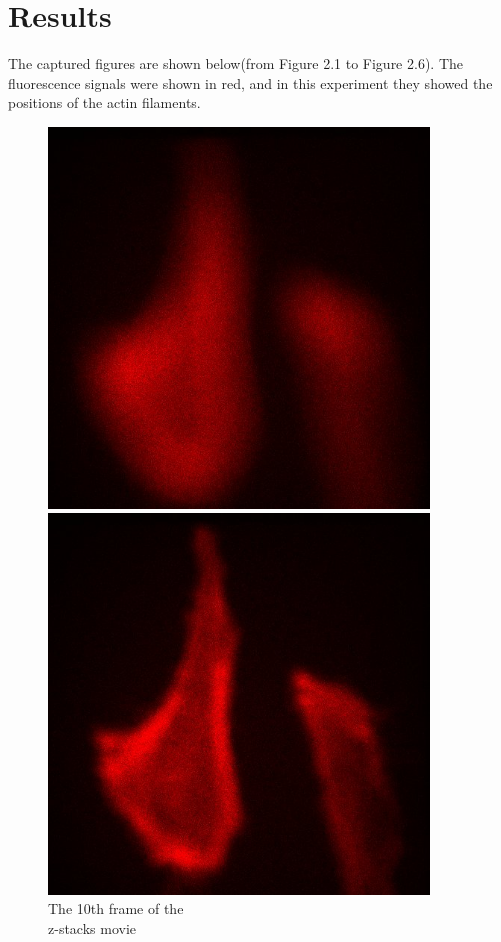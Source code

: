 \documentclass[a4paper,english,12pt,bibliography=totoc]{scrreprt}
\begin{document}
\section{Results}
The captured figures are shown below(from Figure 2.1 to Figure 2.6). The fluorescence signals were shown in red, and in this experiment they showed the positions of the actin filaments.\\
\begin{figure}[htbp]
    \begin{minipage}[t]{0.5\linewidth}
        \centering
        \includegraphics[width=0.9\textwidth]{Images/Actins/Actin_zscan_500nm_10.jpg}
        \caption{The 10th frame of the\\ z-stacks movie}
    \end{minipage}%
    \begin{minipage}[t]{0.5\linewidth}
        \centering
        \includegraphics[width=0.9\textwidth]{Images/Actins/Actin_zscan_500nm_20.jpg}

\end{minipage}
\end{figure}
\end{document}
